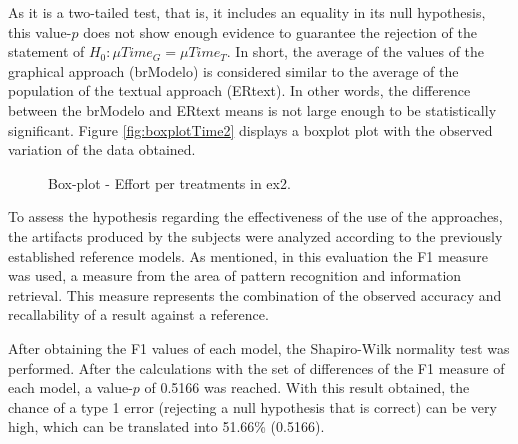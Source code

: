 As it is a two-tailed test, that is, it includes an equality in its null hypothesis, this value-$p$ does not show enough evidence to guarantee the rejection of the statement of $H_0 : \mu Time_G = \mu Time_T$.
In short, the average of the values of the graphical approach (brModelo) is considered similar to the average of the population of the textual approach (ERtext).
In other words, the difference between the brModelo and ERtext means is not large enough to be statistically significant.
Figure \ref{fig:boxplotTime2} displays a boxplot plot with the observed variation of the data obtained.

\begin{figure}[!htb]
        \centering
        \caption{Box-plot - Effort per treatments in \ac{ex2}.}
        \label{fig:boxplotTempo2}
        
\end{figure}

To assess the hypothesis regarding the effectiveness of the use of the approaches, the artifacts produced by the subjects were analyzed according to the previously established reference models.
As mentioned, in this evaluation the F1 measure was used, a measure from the area of pattern recognition and information retrieval.
This measure represents the combination of the observed accuracy and recallability of a result against a reference.

After obtaining the F1 values of each model, the Shapiro-Wilk normality test was performed.
After the calculations with the set of differences of the F1 measure of each model, a value-$p$ of 0.5166 was reached.
With this result obtained, the chance of a type 1 error (rejecting a null hypothesis that is correct) can be very high, which can be translated into 51.66\% (0.5166).

